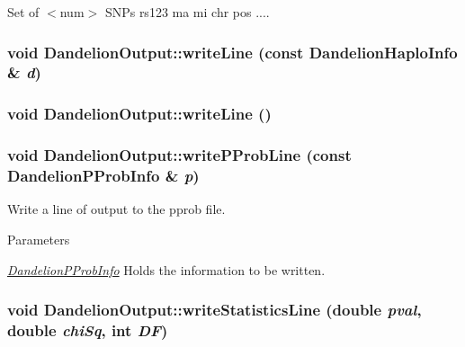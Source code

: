 Set of $<$num$>$ SNPs rs123 ma mi chr pos .... \hypertarget{classDandelionOutput_a97207aef1bd36b64aa00710072b2739d}{
\subsubsection[{writeLine}]{\setlength{\rightskip}{0pt plus 5cm}void DandelionOutput::writeLine (const {\bf DandelionHaploInfo} \& {\em d})}}
\label{classDandelionOutput_a97207aef1bd36b64aa00710072b2739d}
\hypertarget{classDandelionOutput_a86c08bdbc0bce02269f0237361cc9d7d}{
\subsubsection[{writeLine}]{\setlength{\rightskip}{0pt plus 5cm}void DandelionOutput::writeLine ()}}
\label{classDandelionOutput_a86c08bdbc0bce02269f0237361cc9d7d}
\hypertarget{classDandelionOutput_a9697f01201040850bafa5ee8b44c5fc5}{
\subsubsection[{writePProbLine}]{\setlength{\rightskip}{0pt plus 5cm}void DandelionOutput::writePProbLine (const {\bf DandelionPProbInfo} \& {\em p})}}
\label{classDandelionOutput_a9697f01201040850bafa5ee8b44c5fc5}
Write a line of output to the pprob file.


\begin{DoxyParams}{Parameters}
\item[{\em \hyperlink{structDandelionPProbInfo}{DandelionPProbInfo}}]Holds the information to be written. \end{DoxyParams}
\hypertarget{classDandelionOutput_a156a4bbb16c88aa885fc09e9a7f381c5}{
\subsubsection[{writeStatisticsLine}]{\setlength{\rightskip}{0pt plus 5cm}void DandelionOutput::writeStatisticsLine (double {\em pval}, \/  double {\em chiSq}, \/  int {\em DF})}}
\label{classDandelionOutput_a156a4bbb16c88aa885fc09e9a7f381c5}


